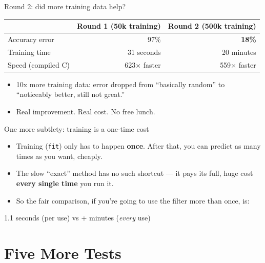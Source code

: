 \documentclass[11pt]{beamer}
\begin{document}
\begin{frame}{Round 2: did more training data help?}
\begin{table}
\centering
\begin{tabular}{lrr}
\toprule
& Round 1 (50k training) & Round 2 (500k training) \\
\midrule
Accuracy error & 97\% & \textbf{18\%} \\
Training time & 31 seconds & 20 minutes \\
Speed (compiled C) & 623$\times$ faster & 559$\times$ faster \\
\bottomrule
\end{tabular}
\end{table}
\begin{itemize}
\item 10x more training data: error dropped from ``basically random'' to ``noticeably better, still not great.''
\item Real improvement. Real cost. No free lunch.
\end{itemize}
\end{frame}

\begin{frame}{One more subtlety: training is a one-time cost}
\begin{itemize}
\item Training (\texttt{fit}) only has to happen \textbf{once}. After that, you can predict as many times as you want, cheaply.
\item The slow ``exact'' method has no such shortcut --- it pays its full, huge cost \textbf{every single time} you run it.
\item So the fair comparison, if you're going to use the filter more than once, is:
\end{itemize}
\begin{block}{}
\centering \Large 1.1 seconds (per use) \quad vs + minutes (\emph{every} use)
\end{block}
\end{frame}

\section{Five More Tests}
\end{document}
